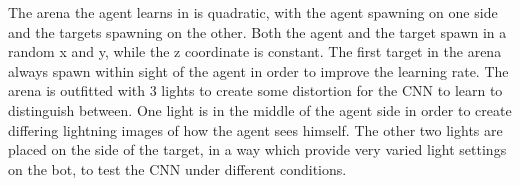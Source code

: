 The arena the agent learns in is quadratic, with the agent spawning on one side and the targets spawning on the other. Both the agent and the target spawn in a random x and y, while the z coordinate is constant. The first target in the arena always spawn within sight of the agent in order to improve the learning rate. The arena is outfitted with 3 lights to create some distortion for the CNN to learn to distinguish between. One light is in the middle of the agent side in order to create differing lightning images of how the agent sees himself. The other two lights are placed on the side of the target, in a way which provide very varied light settings on the bot, to test the CNN under different conditions.





















































